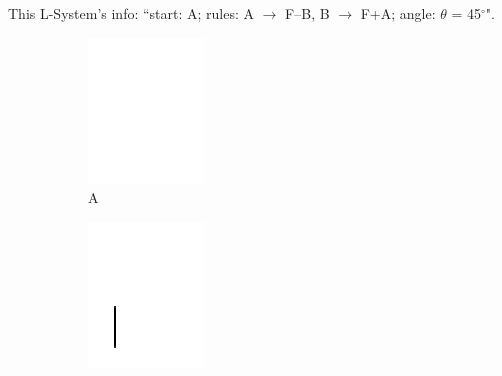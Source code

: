 \documentclass[12pt,twoside]{reedthesis}
\newcommand{\code}[1]{\texttt{#1}}
\begin{document}
	This L-System's info: ``start: A; rules: A $\rightarrow$ F–B, B $\rightarrow$ F+A; angle: $\theta$ = 45$^{\circ}$".


	\begin{figure}[h]
	\begin{subfigure}{0.25\textwidth}
		\centering
		\includegraphics[height=0.8\textwidth]{Images/B0}
		\caption{A}
		\label {B0}
	\end{subfigure}%
	\begin{subfigure}{0.25\textwidth}
		\centering
		\includegraphics[height=0.8\textwidth]{Images/B1}

\end{subfigure}
\end{figure}
\end{document}
